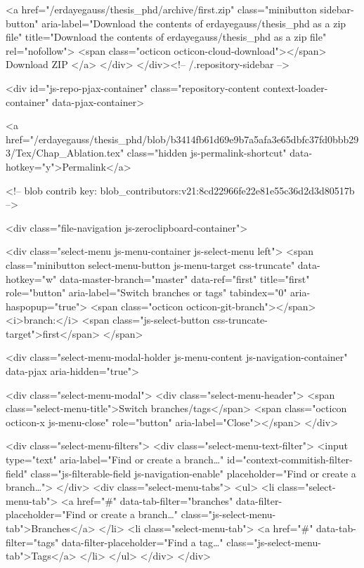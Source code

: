                 <a href="/erdayegauss/thesis_phd/archive/first.zip"
                   class="minibutton sidebar-button"
                   aria-label="Download the contents of erdayegauss/thesis_phd as a zip file"
                   title="Download the contents of erdayegauss/thesis_phd as a zip file"
                   rel="nofollow">
                  <span class="octicon octicon-cloud-download"></span>
                  Download ZIP
                </a>
              </div>
        </div><!-- /.repository-sidebar -->

        <div id="js-repo-pjax-container" class="repository-content context-loader-container" data-pjax-container>
          

<a href="/erdayegauss/thesis_phd/blob/b3414fb61d69e9b7a5afa3e65dbfc37fd0bbb293/Tex/Chap_Ablation.tex" class="hidden js-permalink-shortcut" data-hotkey="y">Permalink</a>

<!-- blob contrib key: blob_contributors:v21:8cd22966fe22e81e55c36d2d3d80517b -->

<div class="file-navigation js-zeroclipboard-container">
  
<div class="select-menu js-menu-container js-select-menu left">
  <span class="minibutton select-menu-button js-menu-target css-truncate" data-hotkey="w"
    data-master-branch="master"
    data-ref="first"
    title="first"
    role="button" aria-label="Switch branches or tags" tabindex="0" aria-haspopup="true">
    <span class="octicon octicon-git-branch"></span>
    <i>branch:</i>
    <span class="js-select-button css-truncate-target">first</span>
  </span>

  <div class="select-menu-modal-holder js-menu-content js-navigation-container" data-pjax aria-hidden="true">

    <div class="select-menu-modal">
      <div class="select-menu-header">
        <span class="select-menu-title">Switch branches/tags</span>
        <span class="octicon octicon-x js-menu-close" role="button" aria-label="Close"></span>
      </div>

      <div class="select-menu-filters">
        <div class="select-menu-text-filter">
          <input type="text" aria-label="Find or create a branch…" id="context-commitish-filter-field" class="js-filterable-field js-navigation-enable" placeholder="Find or create a branch…">
        </div>
        <div class="select-menu-tabs">
          <ul>
            <li class="select-menu-tab">
              <a href="#" data-tab-filter="branches" data-filter-placeholder="Find or create a branch…" class="js-select-menu-tab">Branches</a>
            </li>
            <li class="select-menu-tab">
              <a href="#" data-tab-filter="tags" data-filter-placeholder="Find a tag…" class="js-select-menu-tab">Tags</a>
            </li>
          </ul>
        </div>
      </div>

